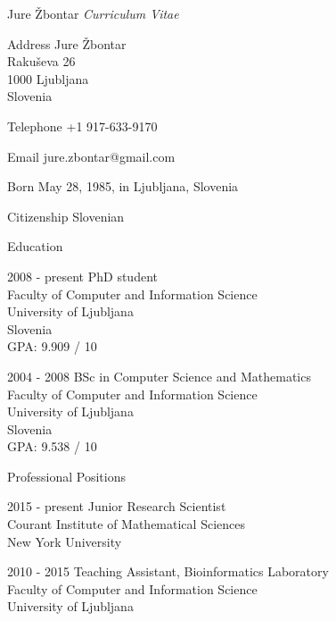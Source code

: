 \documentclass[12pt,a4paper]{article}
\begin{document}
\begin{cv}{Jure \v{Z}bontar}
\noindent \emph{Curriculum Vitae}

\begin{cvlist}{}
\item[Address] Jure \v{Z}bontar \\
Raku\v{s}eva 26 \\
1000 Ljubljana \\
Slovenia

\item[Telephone] +1 917-633-9170

\item[Email] jure.zbontar@gmail.com

\item[Born] May 28, 1985, in Ljubljana, Slovenia
\item[Citizenship] Slovenian

\end{cvlist}

\begin{cvlist}{Education}
\item[2008 - present] PhD student \\
Faculty of Computer and Information Science \\
University of Ljubljana \\
Slovenia \\
GPA: 9.909 / 10

\item[2004 - 2008] BSc in Computer Science and Mathematics \\
Faculty of Computer and Information Science \\
University of Ljubljana \\
Slovenia \\
GPA: 9.538 / 10

\end{cvlist}

\begin{cvlist}{Professional Positions}
\item[2015 - present] Junior Research Scientist \\
Courant Institute of Mathematical Sciences \\
New York University

\item[2010 - 2015] Teaching Assistant, Bioinformatics Laboratory  \\
Faculty of Computer and Information Science \\
University of Ljubljana


\end{cvlist}
\end{cv}
\end{document}

